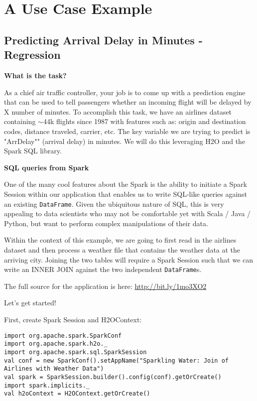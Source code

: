 \section{A Use Case Example}


\subsection{Predicting Arrival Delay in Minutes - Regression}

\textbf{What is the task?}

As a chief air traffic controller, your job is to come up with a prediction engine that can be used to tell
passengers whether an incoming flight will be delayed by X number of minutes. To accomplish this task, we have an
airlines dataset containing ${\sim}$44k flights since 1987 with features such as: origin and destination codes,
distance traveled, carrier, etc.  The key variable we are trying to predict is "ArrDelay"" (arrival delay) in
minutes. We will do this leveraging H2O and the Spark SQL library.

\textbf{SQL queries from Spark}

One of the many cool features about the Spark is the ability to initiate a Spark Session within our
application that enables us to write SQL-like queries against an existing \texttt{DataFrame}. Given the ubiquitous
nature of SQL, this is very appealing to data scientists who may not be comfortable yet with Scala / Java / Python, but
want to perform complex manipulations of their data.

Within the context of this example, we are going to first read in the airlines dataset and then process a weather
file that contains the weather data at the arriving city. Joining the two tables will require a Spark Session such that
we can write an INNER JOIN against the two independent \texttt{DataFrame}s.

The full source for the application is here: \url{http://bit.ly/1mo3XO2}

Let's get started!

First, create Spark Session and H2OContext:

\begin{lstlisting}[style=Scala]
import org.apache.spark.SparkConf
import org.apache.spark.h2o._
import org.apache.spark.sql.SparkSession
val conf = new SparkConf().setAppName("Sparkling Water: Join of Airlines with Weather Data")
val spark = SparkSession.builder().config(conf).getOrCreate()
import spark.implicits._
val h2oContext = H2OContext.getOrCreate()
\end{lstlisting}

